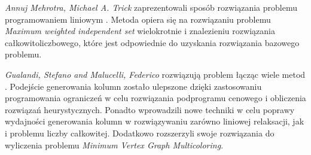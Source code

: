 \textit{Annuj Mehrotra, Michael A. Trick} zaprezentowali sposób rozwiązania problemu programowaniem liniowym \cite{Mehrotra}.
Metoda opiera się na rozwiązaniu problemu \textit{Maximum weighted independent set} wielokrotnie 
i znalezieniu rozwiązania całkowitoliczbowego, które jest odpowiednie do uzyskania rozwiązania bazowego problemu.

\textit{Gualandi, Stefano and Malucelli, Federico} rozwiązują problem łącząc wiele metod \cite{Gualandi}. 
Podejście generowania kolumn zostało ulepszone dzięki zastosowaniu programowania ograniczeń w celu 
rozwiązania podprogramu cenowego i obliczenia rozwiązań heurystycznych. Ponadto wprowadzili nowe techniki 
w celu poprawy wydajności generowania kolumn w rozwiązywaniu zarówno liniowej relaksacji,
jak i problemu liczby całkowitej. Dodatkowo rozszerzyli swoje rozwiązania do wyliczenia problemu \textit{Minimum Vertex Graph Multicoloring}.









\iffalse


\subsection{Algorytm Lawlera}



\begin{algorithm}[H]
    \newenvironment{polishalgorithm}[1][]
    \KwData{graf G}
    \KwData{graf G}
    \KwResult{Liczba chromantyczna}
    $n \leftarrow := |V(G)|$ \\
    $X \leftarrow $ tablica od $0$ do $2^n - 1$ \\
    $X[0] \leftarrow 0$ \\
    \For{$S\leftarrow 1$ \KwTo $2^n - 1$}{
        $s \leftarrow f(S)$ \\
        $X[s] \leftarrow \inf$ \\
        \For{$I\leftarrow  1$ \KwTo $2^n - 1$}{

        }
    }
        
        \caption{LARAC}
\end{algorithm}

\section{Metoda Lawlera} 
Lawler przedstawił 



\section{Metody heurystyczne}


\fi
